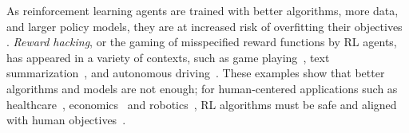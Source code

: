 As reinforcement learning agents are trained with better algorithms, more data, and larger policy models, they are at increased risk of overfitting their objectives \citep{russell2019human}. \emph{Reward hacking}, or the gaming of misspecified reward functions by RL agents, has appeared in a variety of contexts, such as game playing~\citep{ibarz2018humandemo}, 
text summarization~\citep{paulus2018drl_summarization}, and autonomous driving~\citep{knox2021misdesign}. %
These examples show that better algorithms and models are not enough; for human-centered applications such as healthcare~\citep{yu2019rlhealth}, economics~\citep{trott2021aieconomist} and  robotics~\citep{kober2013robotics}, RL algorithms must be safe and aligned with human objectives~\citep{bommansani2021foundational,hubinger2019risks}. 

